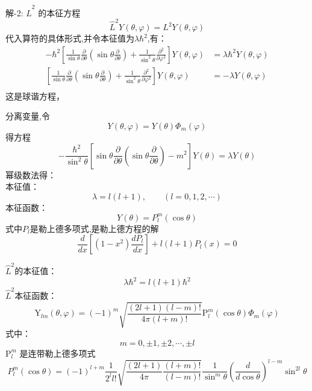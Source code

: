 \begin{frame} 
    \alert{解-2:} $\hat{L}^2$ 的本征方程
    $$\hat{L}^2Y(\theta,\varphi)=L^2 Y(\theta,\varphi)$$
    代入算符的具体形式,并令本征值为$\lambda\hbar^2$,有：
    \begin{equation*}
        \begin{split}
            -\hbar^{2}\left[\frac{1}{\sin \theta} \frac{\partial}{\partial \theta}\left(\sin \theta \frac{\partial}{\partial \theta}\right)+\frac{1}{\sin ^{2} \theta} \frac{\partial^{2}}{\partial \varphi^{2}}\right] Y(\theta,\varphi)&=\lambda\hbar^2 Y(\theta,\varphi) \\
            \left[\frac{1}{\sin \theta} \frac{\partial}{\partial \theta}\left(\sin \theta \frac{\partial}{\partial \theta}\right)+\frac{1}{\sin ^{2} \theta} \frac{\partial^{2}}{\partial \varphi^{2}}\right] Y(\theta,\varphi)&=-\lambda Y(\theta,\varphi) \\
        \end{split} 
    \end{equation*}
    这是球谐方程，
\end{frame} 

\begin{frame} 
    分离变量,令 
    \[ Y(\theta,\varphi)= Y(\theta)\Phi_m(\varphi)\]
    得方程
    \begin{equation}
        -\frac{\hbar^{2}}{\sin ^{2} \theta}\left[\sin \theta \frac{\partial}{\partial \theta} \left(\sin \theta \frac{\partial}{\partial \theta}\right)-m^{2}\right] Y(\theta)=\lambda Y(\theta)
    \end{equation}
    幂级数法得：\\
    本征值： $$\lambda=l(l+1), \qquad (l= 0,1,2,\cdots)$$ 
    本征函数：$$Y(\theta)=P_{l} ^m(\cos \theta)$$
    式中$P_{l}$是勒上德多项式,是勒上德方程的解 
    \begin{equation}
        \frac{d}{d x}\left[\left(1-x^{2}\right) \frac{d P_{l}}{d x}\right]+l(l+1) P_{l}(x)=0 
    \end{equation}
\end{frame} 

\begin{frame} 
    $\hat{L}^2$的本征值：$$\lambda\hbar^2=l(l+1)\hbar^2$$
    $\hat{L}^2$本征函数：
    $$
    \mathrm{Y}_{l m}(\theta, \varphi)=(-1)^{m} \sqrt{\frac{(2 l+1)(l-m) !}{4 \pi(l+m) !}} \mathrm{P}_{l}^{m}(\cos \theta) \Phi_{m}(\varphi)
    $$ 
    式中：
    $$ m=0,\pm 1,  \pm 2, \cdots, \pm l  $$
    $\mathrm{P}_{l}^{m} $ 是连带勒上德多项式
    $$
    P_{l}^{m}(\cos \theta)=(-1)^{l+m} \frac{1}{2^{l} l !} \sqrt{\frac{(2 l+1)}{4 \pi} \frac{(l+m) !}{(l-m) !} } \frac{1}{\sin ^{m} \theta}\left(\frac{d}{d \cos \theta}\right)^{l-m} \sin ^{2 l} \theta
    $$
\end{frame} 

